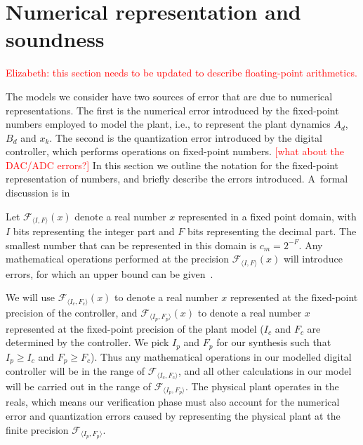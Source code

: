 \documentclass[twocolumn]{autart}    %
\begin{document}
\section{Numerical representation and soundness} 
\label{sec:numeric_rep}

\textcolor{red}{Elizabeth: this section needs to be updated to describe floating-point arithmetics.}

The models we consider have two sources of error that are due to numerical representations.  
The first is the numerical error introduced by the
fixed-point numbers employed to model the plant, i.e., to represent the
plant dynamics $A_d$, $B_d$ and $x_k$.  The second is the quantization error
introduced by the digital controller, which performs operations on
fixed-point numbers.  
\textcolor{red}{[what about the DAC/ADC errors?]}
In this section we outline the notation for the
fixed-point representation of numbers, and briefly describe the errors
introduced.  A~formal discussion is in

Let $\mathcal{F}_{\langle I,F \rangle}(x)$ denote a real number $x$
represented in a fixed point domain, with $I$ bits representing the integer
part and $F$ bits representing the decimal part.  The smallest number that
can be represented in this domain is $c_m=2^{-F}$.  Any mathematical
operations performed at the precision $\mathcal{F}_{\langle I,F \rangle}(x)$
will introduce errors, for which an upper bound can be
given~\cite{DBLP:conf/arith/BrainTRW15}.

We will use $\mathcal{F}_{\langle I_c,F_c \rangle}(x)$ to denote a real
number $x$ represented at the fixed-point precision of the controller, and
$\mathcal{F}_{\langle I_p,F_p \rangle}(x)$ to denote a real number $x$
represented at the fixed-point precision of the plant model ($I_c$ and $F_c$
are determined by the controller.  We pick $I_p$ and $F_p$ for our synthesis
such that $I_p \geq I_c$ and $\allowbreak F_p \geq F_c$).  Thus any
mathematical operations in our modelled digital controller will be in the
range of $\mathcal{F}_{\langle I_c,F_c \rangle}$, and all other calculations
in our model will be carried out in the range of $\mathcal{F}_{\langle
I_p,F_p \rangle}$.  The physical plant operates in the reals, which means
our verification phase must also account for the numerical error and
quantization errors caused by representing the physical plant at the finite
precision $\mathcal{F}_{\langle I_p,F_p \rangle}$.
\end{document}
